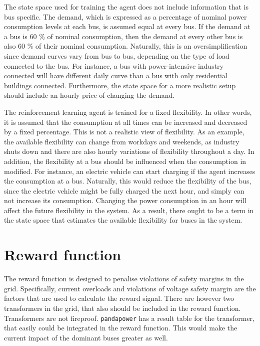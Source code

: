 \documentclass[class=book, crop=false, 11pt]{standalone}
\begin{document}
The state space used for training the agent does not include information that is bus specific. The demand, which is expressed as a percentage of nominal power consumption levels at each bus, is assumed equal at every bus. If the demand at a bus is 60 \% of nominal consumption, then the demand at every other bus is also 60 \% of their nominal consumption. Naturally, this is an oversimplification since demand curves vary from bus to bus, depending on the type of load connected to the bus. For instance, a bus with power-intensive industry connected will have different daily curve than a bus with only residential buildings connected. Furthermore, the state space for a more realistic setup should include an hourly price of changing the demand.

The reinforcement learning agent is trained for a fixed flexibility. In other words, it is assumed that the consumption at all times can be increased and decreased by a fixed percentage. This is not a realistic view of flexibility. As an example, the available flexibility can change from workdays and weekends, as industry shuts down and there are also hourly variations of flexibility throughout a day. In addition, the flexibility at a bus should be influenced when the consumption in modified. For instance, an electric vehicle can start charging if the agent increases the consumption at a bus. Naturally, this would reduce the flexibility of the bus, since the electric vehicle might be fully charged the next hour, and simply can not increase its consumption. Changing the power consumption in an hour will affect the future flexibility in the system. As a result, there ought to be a term in the state space that estimates the available flexibility for buses in the system. 


\section{Reward function}
The reward function is designed to penalise violations of safety margins in the grid. Specifically, current overloads and violations of voltage safety margin are the factors that are used to calculate the reward signal. There are however two transformers in the grid, that also should be included in the reward function. Transformers are not fireproof. \texttt{pandapower} has a result table for the transformer, that easily could be integrated in the reward function. This would make the current impact of the dominant buses greater as well. 
\end{document}
